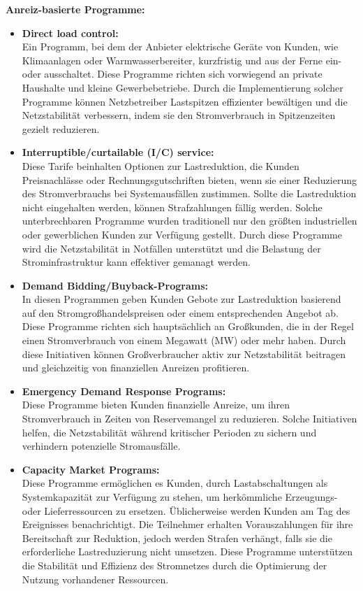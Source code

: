 \textbf{Anreiz-basierte Programme:}
\begin{itemize}[label={--}]
	\item \textbf{Direct load control:}\\
	Ein Programm, bei dem der Anbieter elektrische Geräte von Kunden, wie Klimaanlagen oder Warmwasserbereiter, kurzfristig und aus der Ferne ein- oder ausschaltet. Diese Programme richten sich vorwiegend an private Haushalte und kleine Gewerbebetriebe. Durch die Implementierung solcher Programme können Netzbetreiber Lastspitzen effizienter bewältigen und die Netzstabilität verbessern, indem sie den Stromverbrauch in Spitzenzeiten gezielt reduzieren.
	
	\item \textbf{Interruptible/curtailable (I/C) service:}\\
	Diese Tarife beinhalten Optionen zur Lastreduktion, die Kunden Preisnachlässe oder Rechnungsgutschriften bieten, wenn sie einer Reduzierung des Stromverbrauchs bei Systemausfällen zustimmen. Sollte die Lastreduktion nicht eingehalten werden, können Strafzahlungen fällig werden. Solche unterbrechbaren Programme wurden traditionell nur den größten industriellen oder gewerblichen Kunden zur Verfügung gestellt. Durch diese Programme wird die Netzstabilität in Notfällen unterstützt und die Belastung der Strominfrastruktur kann effektiver gemanagt werden.
	
	\item \textbf{Demand Bidding/Buyback-Programs:}\\
	In diesen Programmen geben Kunden Gebote zur Lastreduktion basierend auf den Stromgroßhandelspreisen oder einem entsprechenden Angebot ab. Diese Programme richten sich hauptsächlich an Großkunden, die in der Regel einen Stromverbrauch von einem Megawatt (MW) oder mehr haben. Durch diese Initiativen können Großverbraucher aktiv zur Netzstabilität beitragen und gleichzeitig von finanziellen Anreizen profitieren.
	
	\item \textbf{Emergency Demand Response Programs:}\\
	Diese Programme bieten Kunden finanzielle Anreize, um ihren Stromverbrauch in Zeiten von Reservemangel zu reduzieren. Solche Initiativen helfen, die Netzstabilität während kritischer Perioden zu sichern und verhindern potenzielle Stromausfälle.
	
	\item \textbf{Capacity Market Programs:}\\
	Diese Programme ermöglichen es Kunden, durch Lastabschaltungen als Systemkapazität zur Verfügung zu stehen, um herkömmliche Erzeugungs- oder Lieferressourcen zu ersetzen. Üblicherweise werden Kunden am Tag des Ereignisses benachrichtigt. Die Teilnehmer erhalten Vorauszahlungen für ihre Bereitschaft zur Reduktion, jedoch werden Strafen verhängt, falls sie die erforderliche Lastreduzierung nicht umsetzen. Diese Programme unterstützen die Stabilität und Effizienz des Stromnetzes durch die Optimierung der Nutzung vorhandener Ressourcen.
	

\end{itemize}
